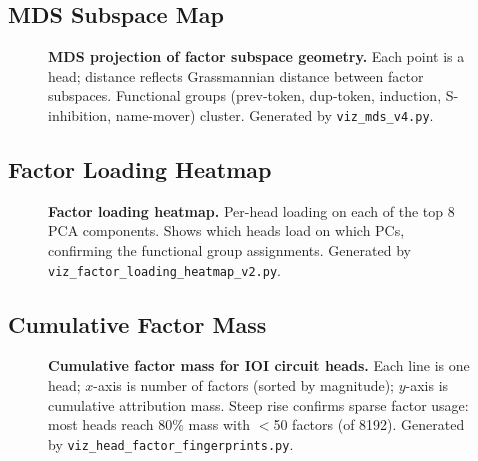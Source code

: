 \documentclass[11pt]{article}
\begin{document}

\subsection{MDS Subspace Map}
\label{fig:mds_subspace}

\begin{figure}[h!]
\centering
\caption{\textbf{MDS projection of factor subspace geometry.} Each
point is a head; distance reflects Grassmannian distance between
factor subspaces. Functional groups (prev-token, dup-token, induction,
S-inhibition, name-mover) cluster. Generated by \texttt{viz\_mds\_v4.py}.}
\end{figure}


\subsection{Factor Loading Heatmap}
\label{fig:factor_loading}

\begin{figure}[h!]
\centering
\caption{\textbf{Factor loading heatmap.} Per-head loading on each of
the top 8 PCA components. Shows which heads load on which PCs,
confirming the functional group assignments. Generated by
\texttt{viz\_factor\_loading\_heatmap\_v2.py}.}
\end{figure}


\subsection{Cumulative Factor Mass}
\label{fig:factor_mass}

\begin{figure}[h!]
\centering
\caption{\textbf{Cumulative factor mass for IOI circuit heads.}
Each line is one head; $x$-axis is number of factors (sorted by
magnitude); $y$-axis is cumulative attribution mass. Steep rise
confirms sparse factor usage: most heads reach 80\% mass with
$<$50 factors (of 8192). Generated by
\texttt{viz\_head\_factor\_fingerprints.py}.}
\end{figure}
\end{document}
